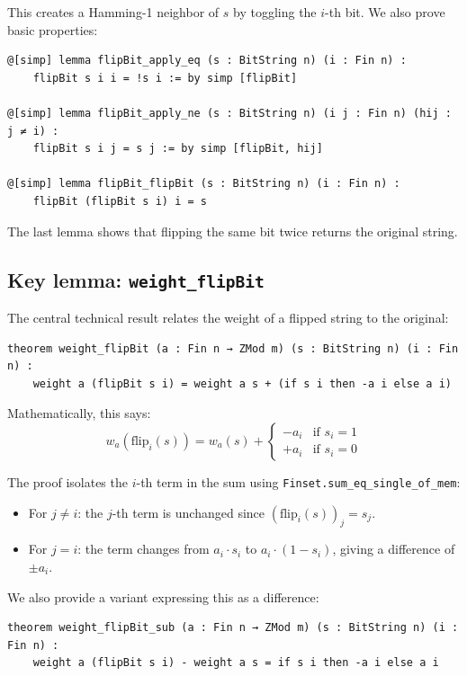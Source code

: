 \documentclass[11pt]{article}
\begin{document}
This creates a Hamming-1 neighbor of $s$ by toggling the $i$-th bit.
We also prove basic properties:

\begin{lstlisting}
@[simp] lemma flipBit_apply_eq (s : BitString n) (i : Fin n) :
    flipBit s i i = !s i := by simp [flipBit]

@[simp] lemma flipBit_apply_ne (s : BitString n) (i j : Fin n) (hij : j ≠ i) :
    flipBit s i j = s j := by simp [flipBit, hij]

@[simp] lemma flipBit_flipBit (s : BitString n) (i : Fin n) :
    flipBit (flipBit s i) i = s
\end{lstlisting}

The last lemma shows that flipping the same bit twice returns the original string.

\subsection*{Key lemma: \texttt{weight\_flipBit}}

The central technical result relates the weight of a flipped string to the original:

\begin{lstlisting}
theorem weight_flipBit (a : Fin n → ZMod m) (s : BitString n) (i : Fin n) :
    weight a (flipBit s i) = weight a s + (if s i then -a i else a i)
\end{lstlisting}

Mathematically, this says:
\[
w_a(\text{flip}_i(s)) = w_a(s) + \begin{cases} -a_i & \text{if } s_i = 1 \\ +a_i & \text{if } s_i = 0 \end{cases}
\]

The proof isolates the $i$-th term in the sum using \texttt{Finset.sum\_eq\_single\_of\_mem}:
\begin{itemize}
\item For $j \neq i$: the $j$-th term is unchanged since $(\text{flip}_i(s))_j = s_j$.
\item For $j = i$: the term changes from $a_i \cdot s_i$ to $a_i \cdot (1 - s_i)$, giving a difference of $\pm a_i$.
\end{itemize}

We also provide a variant expressing this as a difference:

\begin{lstlisting}
theorem weight_flipBit_sub (a : Fin n → ZMod m) (s : BitString n) (i : Fin n) :
    weight a (flipBit s i) - weight a s = if s i then -a i else a i
\end{lstlisting}
\end{document}

